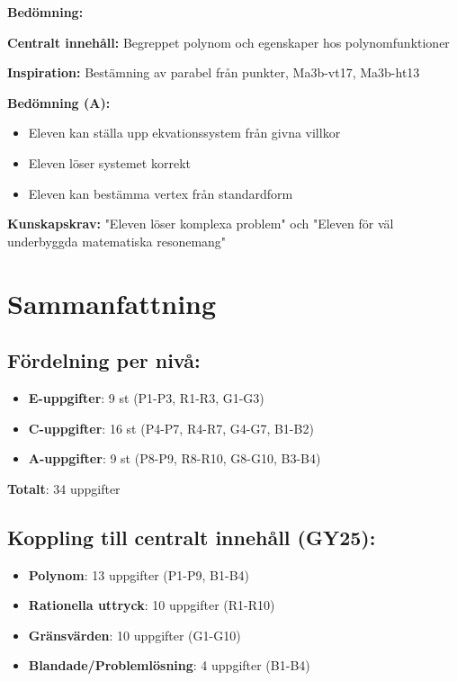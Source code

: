 \documentclass[12pt]{article}
\begin{document}
\begin{refbox}
\textbf{Bedömning:}

\textbf{Centralt innehåll:} Begreppet polynom och egenskaper hos polynomfunktioner

\textbf{Inspiration:} Bestämning av parabel från punkter, Ma3b-vt17, Ma3b-ht13

\textbf{Bedömning (A):}
\begin{itemize}
    \item Eleven kan ställa upp ekvationssystem från givna villkor
    \item Eleven löser systemet korrekt
    \item Eleven kan bestämma vertex från standardform
\end{itemize}

\textbf{Kunskapskrav:} "Eleven löser komplexa problem" och "Eleven för väl underbyggda matematiska resonemang"
\end{refbox}

\newpage

\section*{Sammanfattning}

\subsection*{Fördelning per nivå:}
\begin{itemize}
    \item \textbf{E-uppgifter}: 9 st (P1-P3, R1-R3, G1-G3)
    \item \textbf{C-uppgifter}: 16 st (P4-P7, R4-R7, G4-G7, B1-B2)
    \item \textbf{A-uppgifter}: 9 st (P8-P9, R8-R10, G8-G10, B3-B4)
\end{itemize}

\textbf{Totalt}: 34 uppgifter

\subsection*{Koppling till centralt innehåll (GY25):}
\begin{itemize}
    \item \textbf{Polynom}: 13 uppgifter (P1-P9, B1-B4)
    \item \textbf{Rationella uttryck}: 10 uppgifter (R1-R10)
    \item \textbf{Gränsvärden}: 10 uppgifter (G1-G10)
    \item \textbf{Blandade/Problemlösning}: 4 uppgifter (B1-B4)
\end{itemize}
\end{document}
